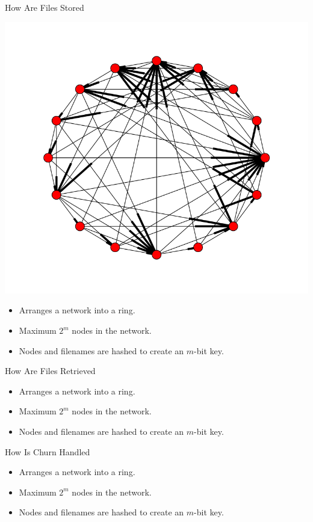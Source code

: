 \documentclass{beamer}
\begin{document}
\begin{frame}{How Are Files Stored}
\begin{center}\includegraphics[scale=0.25]{chordreal}\end{center}
	\begin{itemize}
		\item Arranges a network into a ring.
		\item Maximum $2^m$ nodes in the network.
		\item Nodes and filenames are hashed to create an $m$-bit key.
	\end{itemize}

\end{frame}


\begin{frame}{How Are Files Retrieved}
	\begin{itemize}
		\item Arranges a network into a ring.
		\item Maximum $2^m$ nodes in the network.
		\item Nodes and filenames are hashed to create an $m$-bit key.
	\end{itemize}

\end{frame}


\begin{frame}{How Is Churn Handled}
	\begin{itemize}
		\item Arranges a network into a ring.
		\item Maximum $2^m$ nodes in the network.
		\item Nodes and filenames are hashed to create an $m$-bit key.
	\end{itemize}

\end{frame}
\end{document}
